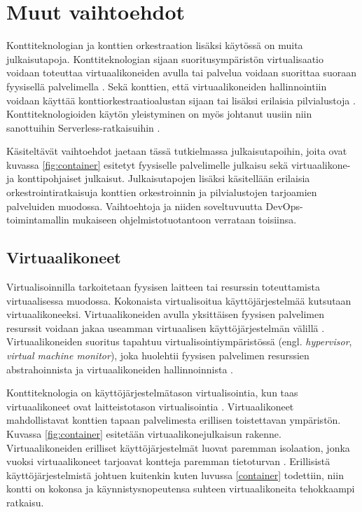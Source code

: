 \chapter{Muut vaihtoehdot\label{options}}

Konttiteknologian ja konttien orkestraation lisäksi käytössä on muita julkaisutapoja. Konttiteknologian sijaan suoritusympäristön virtualisaatio voidaan toteuttaa virtuaalikoneiden avulla tai palvelua voidaan suorittaa suoraan fyysisellä palvelimella \cite{Watada19}.
Sekä konttien, että virtuaalikoneiden hallinnointiin voidaan käyttää konttiorkestraatioalustan sijaan tai lisäksi erilaisia pilvialustoja \cite{Bousselmi14}.
Konttiteknologioiden käytön yleistyminen on myös johtanut uusiin niin sanottuihin Serverless-ratkaisuihin \cite{Baldini17}.

Käsiteltävät vaihtoehdot jaetaan tässä tutkielmassa julkaisutapoihin, joita ovat kuvassa \ref{fig:container} esitetyt fyysiselle palvelimelle julkaisu sekä virtuaalikone- ja konttipohjaiset julkaisut.
Julkaisutapojen lisäksi käsitellään erilaisia orkestrointiratkaisuja konttien orkestroinnin ja pilvialustojen tarjoamien palveluiden muodossa.
Vaihtoehtoja ja niiden soveltuvuutta DevOps-toimintamallin mukaiseen ohjelmistotuotantoon verrataan toisiinsa.

\section{Virtuaalikoneet}

Virtualisoinnilla tarkoitetaan fyysisen laitteen tai resurssin toteuttamista virtuaalisessa muodossa.
Kokonaista virtualisoitua käyttöjärjestelmää kutsutaan virtuaalikoneeksi.
Virtuaalikoneiden avulla yksittäisen fyysisen palvelimen resurssit voidaan jakaa useamman virtuaalisen käyttöjärjestelmän välillä \cite{Smith05}.
Virtuaalikoneiden suoritus tapahtuu virtualisointiympäristössä (engl. \textit{hypervisor}, \textit{virtual machine monitor}), joka huolehtii fyysisen palvelimen resurssien abstrahoinnista ja virtuaalikoneiden hallinnoinnista \cite{desai13}.

Konttiteknologia on käyttöjärjestelmätason virtualisointia, kun taas virtuaalikoneet ovat laitteistotason virtualisointia \cite{}.
Virtuaalikoneet mahdollistavat konttien tapaan palvelimesta erillisen toistettavan ympäristön.
Kuvassa \ref{fig:container} esitetään virtuaalikonejulkaisun rakenne.
Virtuaalikoneiden erilliset käyttöjärjestelmät luovat paremman isolaation, jonka vuoksi virtuaalikoneet tarjoavat kontteja paremman tietoturvan \cite{Sultan19}.
Erillisistä käyttöjärjestelmistä johtuen kuitenkin kuten luvussa \ref{container} todettiin, niin kontti on kokonsa ja käynnistysnopeutensa suhteen virtuaalikoneita tehokkaampi ratkaisu.

